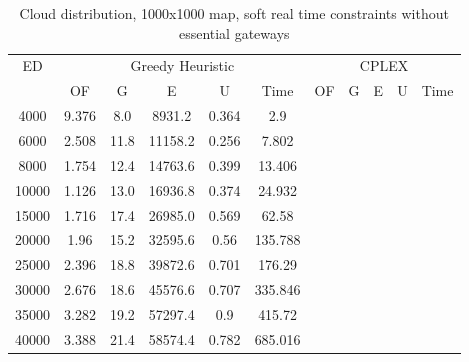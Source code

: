 \begin{table}[htb]
	\centering
	\begin{tabular}{|c|c|c|c|c|c|c|c|c|c|c|}
		\hline
		\multirow{2}{*}{ED} & \multicolumn{5}{c|}{Greedy Heuristic} & \multicolumn{5}{c|}{CPLEX}\\ 
		\cline{2-11}
& OF & G & E & U & Time & OF & G & E & U & Time\\ 
		\hline
		4000 & 9.376 & 8.0 & 8931.2 & 0.364 & 2.9 & & & & &  \\ 
		6000 & 2.508 & 11.8 & 11158.2 & 0.256 & 7.802 & & & & &  \\ 
		8000 & 1.754 & 12.4 & 14763.6 & 0.399 & 13.406 & & & & &  \\ 
		10000 & 1.126 & 13.0 & 16936.8 & 0.374 & 24.932 & & & & &  \\ 
		15000 & 1.716 & 17.4 & 26985.0 & 0.569 & 62.58 & & & & &  \\ 
		20000 & 1.96 & 15.2 & 32595.6 & 0.56 & 135.788 & & & & &  \\ 
		25000 & 2.396 & 18.8 & 39872.6 & 0.701 & 176.29 & & & & &  \\ 
		30000 & 2.676 & 18.6 & 45576.6 & 0.707 & 335.846 & & & & &  \\ 
		35000 & 3.282 & 19.2 & 57297.4 & 0.9 & 415.72 & & & & &  \\ 
		40000 & 3.388 & 21.4 & 58574.4 & 0.782 & 685.016 & & & & &  \\ 
		\hline 
	\end{tabular} 
	\caption{Cloud distribution, 1000x1000 map, soft real time constraints without essential gateways} 
	\label{tab:cloud_soft_n_esc_1000} 
\end{table} 

